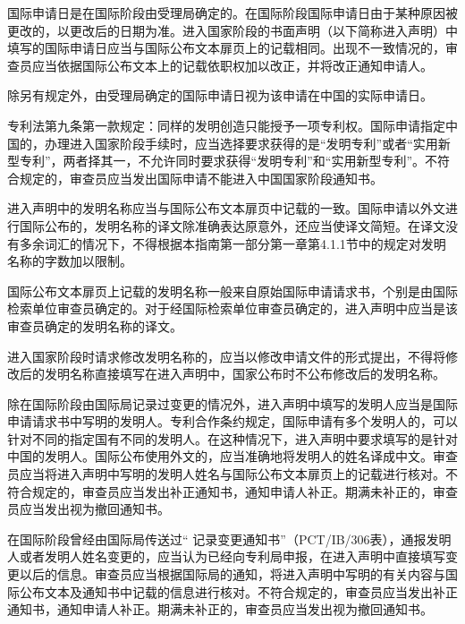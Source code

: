 国际申请日是在国际阶段由受理局确定的。在国际阶段国际申请日由于某种原因被更改的，以更改后的日期为准。进入国家阶段的书面声明（以下简称进入声明）中填写的国际申请日应当与国际公布文本扉页上的记载相同。出现不一致情况的，审查员应当依据国际公布文本上的记载依职权加以改正，并将改正通知申请人。

除另有规定外，由受理局确定的国际申请日视为该申请在中国的实际申请日。

专利法第九条第一款规定：同样的发明创造只能授予一项专利权。国际申请指定中国的，办理进入国家阶段手续时，应当选择要求获得的是“发明专利”或者“实用新型专利”，两者择其一，不允许同时要求获得“发明专利”和“实用新型专利”。不符合规定的，审查员应当发出国际申请不能进入中国国家阶段通知书。

进入声明中的发明名称应当与国际公布文本扉页中记载的一致。国际申请以外文进行国际公布的，发明名称的译文除准确表达原意外，还应当使译文简短。在译文没有多余词汇的情况下，不得根据本指南第一部分第一章第4.1.1节中的规定对发明名称的字数加以限制。

国际公布文本扉页上记载的发明名称一般来自原始国际申请请求书，个别是由国际检索单位审查员确定的。对于经国际检索单位审查员确定的，进入声明中应当是该审查员确定的发明名称的译文。

进入国家阶段时请求修改发明名称的，应当以修改申请文件的形式提出，不得将修改后的发明名称直接填写在进入声明中，国家公布时不公布修改后的发明名称。

除在国际阶段由国际局记录过变更的情况外，进入声明中填写的发明人应当是国际申请请求书中写明的发明人。专利合作条约规定，国际申请有多个发明人的，可以针对不同的指定国有不同的发明人。在这种情况下，进入声明中要求填写的是针对中国的发明人。国际公布使用外文的，应当准确地将发明人的姓名译成中文。审查员应当将进入声明中写明的发明人姓名与国际公布文本扉页上的记载进行核对。不符合规定的，审查员应当发出补正通知书，通知申请人补正。期满未补正的，审查员应当发出视为撤回通知书。

在国际阶段曾经由国际局传送过“ 记录变更通知书”（PCT/IB/306表），通报发明人或者发明人姓名变更的，应当认为已经向专利局申报，在进入声明中直接填写变更以后的信息。审查员应当根据国际局的通知，将进入声明中写明的有关内容与国际公布文本及通知书中记载的信息进行核对。不符合规定的，审查员应当发出补正通知书，通知申请人补正。期满未补正的，审查员应当发出视为撤回通知书。

